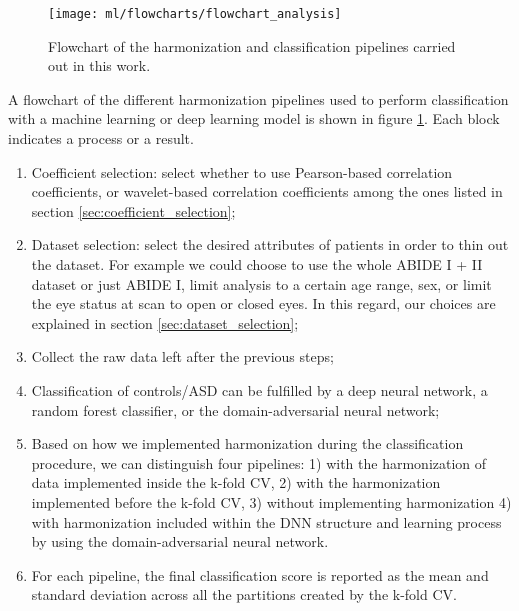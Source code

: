 \documentclass[11pt]{report}
\begin{document}
\begin{figure}[h!]
\centering
\texttt{[image: ml/flowcharts/flowchart\_analysis]}
\caption{Flowchart of the harmonization and classification pipelines carried out in this work.
}
\label{fig:workflowanalysis}
\end{figure}



A flowchart of the different harmonization pipelines used to perform classification with a machine learning or deep learning model is shown in figure \ref{fig:workflowanalysis}.
Each block indicates a process or a result.
\begin{enumerate}
\item Coefficient selection: select whether to use Pearson-based correlation coefficients, or wavelet-based correlation coefficients among the ones listed in section \ref{sec:coefficient_selection};
\item Dataset selection: select the desired attributes of patients in order to thin out the dataset. For example we could choose to use the whole ABIDE I + II dataset or just ABIDE I, limit analysis to a certain age range, sex, or limit the eye status at scan to open or closed eyes. In this regard, our choices are explained in section \ref{sec:dataset_selection};
\item Collect the raw data left after the previous steps;
\item Classification of controls/ASD can be fulfilled by a deep neural network, a random forest classifier, or the domain-adversarial neural network;
\item Based on how we implemented harmonization during the classification procedure, we can distinguish four pipelines: 1) with the harmonization of data implemented inside the k-fold CV,  2) with the harmonization implemented before the k-fold CV, 3) without implementing harmonization 4) with harmonization included within the DNN structure and learning process by using the domain-adversarial neural network.
\item For each pipeline, the final classification score is reported as the mean and standard deviation across all the partitions created by the k-fold CV.
\end{enumerate}
\end{document}
